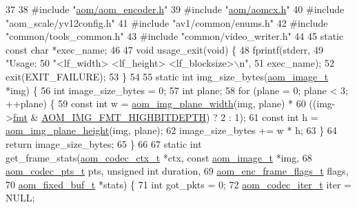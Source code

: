 \begin{DoxyCodeInclude}
37 
38 \textcolor{preprocessor}{#include "\hyperlink{aom__encoder_8h}{aom/aom\_encoder.h}"}
39 \textcolor{preprocessor}{#include "\hyperlink{aomcx_8h}{aom/aomcx.h}"}
40 \textcolor{preprocessor}{#include "aom\_scale/yv12config.h"}
41 \textcolor{preprocessor}{#include "av1/common/enums.h"}
42 \textcolor{preprocessor}{#include "common/tools\_common.h"}
43 \textcolor{preprocessor}{#include "common/video\_writer.h"}
44 
45 \textcolor{keyword}{static} \textcolor{keyword}{const} \textcolor{keywordtype}{char} *exec\_name;
46 
47 \textcolor{keywordtype}{void} usage\_exit(\textcolor{keywordtype}{void}) \{
48   fprintf(stderr,
49           \textcolor{stringliteral}{"Usage: %
50           \textcolor{stringliteral}{"<lf\_width> <lf\_height> <lf\_blocksize>\(\backslash\)n"},
51           exec\_name);
52   exit(EXIT\_FAILURE);
53 \}
54 
55 \textcolor{keyword}{static} \textcolor{keywordtype}{int} img\_size\_bytes(\hyperlink{structaom__image}{aom\_image\_t} *img) \{
56   \textcolor{keywordtype}{int} image\_size\_bytes = 0;
57   \textcolor{keywordtype}{int} plane;
58   \textcolor{keywordflow}{for} (plane = 0; plane < 3; ++plane) \{
59     \textcolor{keyword}{const} \textcolor{keywordtype}{int} w = \hyperlink{aom__image_8h_adfb2ea2e110ee42e38370868b64bf232}{aom\_img\_plane\_width}(img, plane) *
60                   ((img->\hyperlink{structaom__image_a6c64b1ab918d80d52eb8f5d6d957e825}{fmt} & \hyperlink{aom__image_8h_a607b37d91f75442f54223ecd85f1b6cb}{AOM\_IMG\_FMT\_HIGHBITDEPTH}) ? 2 : 1);
61     \textcolor{keyword}{const} \textcolor{keywordtype}{int} h = \hyperlink{aom__image_8h_ab87684a93e3da97bd6223d1e46876848}{aom\_img\_plane\_height}(img, plane);
62     image\_size\_bytes += w * h;
63   \}
64   \textcolor{keywordflow}{return} image\_size\_bytes;
65 \}
66 
67 \textcolor{keyword}{static} \textcolor{keywordtype}{int} get\_frame\_stats(\hyperlink{structaom__codec__ctx}{aom\_codec\_ctx\_t} *ctx, \textcolor{keyword}{const} 
      \hyperlink{structaom__image}{aom\_image\_t} *img,
68                            \hyperlink{group__encoder_ga958524226c9a65251c9e4f7bb78fc606}{aom\_codec\_pts\_t} pts, \textcolor{keywordtype}{unsigned} \textcolor{keywordtype}{int} duration,
69                            \hyperlink{group__encoder_gacbef92200b831adb94283f84128f83de}{aom\_enc\_frame\_flags\_t} flags,
70                            \hyperlink{structaom__fixed__buf}{aom\_fixed\_buf\_t} *stats) \{
71   \textcolor{keywordtype}{int} got\_pkts = 0;
72   \hyperlink{group__codec_gadf9e173c9e02788a9999399edab20a02}{aom\_codec\_iter\_t} iter = NULL;
}
\end{DoxyCodeInclude}
